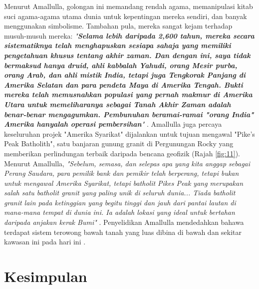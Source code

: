 \documentclass[10pt,twocolumn,letterpaper]{article}
\begin{document}
Menurut Amallulla, golongan ini memandang rendah agama, memanipulasi kitab suci agama-agama utama dunia untuk kepentingan mereka sendiri, dan banyak menggunakan simbolisme. Tambahan pula, mereka sangat kejam terhadap musuh-musuh mereka: \textit{"\textbf{Selama lebih daripada 2,600 tahun, mereka secara sistematiknya telah menghapuskan sesiapa sahaja yang memiliki pengetahuan khusus tentang akhir zaman. Dan dengan ini, saya tidak bermaksud hanya druid, ahli kabbalah Yahudi, orang Mesir purba, orang Arab, dan ahli mistik India, tetapi juga Tengkorak Panjang di Amerika Selatan dan para pendeta Maya di Amerika Tengah. Bukti mereka telah memusnahkan populasi yang pernah makmur di Amerika Utara untuk memeliharanya sebagai Tanah Akhir Zaman adalah benar-benar mengagumkan. Pembunuhan beramai-ramai "orang India" Amerika hanyalah operasi pembersihan}"} \cite{33,34}.
Amallulla juga percaya keseluruhan projek "Amerika Syarikat" dijalankan untuk tujuan mengawal "Pike's Peak Batholith", satu banjaran gunung granit di Pergunungan Rocky yang memberikan perlindungan terbaik daripada bencana geofizik (Rajah \ref{fig:11}). Menurut Amallulla, \textit{"Sebelum, semasa, dan selepas apa yang kita anggap sebagai Perang Saudara, para pemilik bank dan pemikir telah berperang, tetapi bukan untuk mengawal Amerika Syarikat, tetapi batholit Pikes Peak yang merupakan salah satu batholit granit yang paling unik di seluruh dunia... Tiada batholit granit lain pada ketinggian yang begitu tinggi dan jauh dari pantai lautan di mana-mana tempat di dunia ini. Ia adalah lokasi yang ideal untuk bertahan daripada anjakan kerak Bumi"} \cite{33,34}. Penyelidikan Amallulla mendedahkan bahawa terdapat sistem terowong bawah tanah yang luas dibina di bawah dan sekitar kawasan ini pada hari ini \cite{36}.

\section{Kesimpulan}
\end{document}

